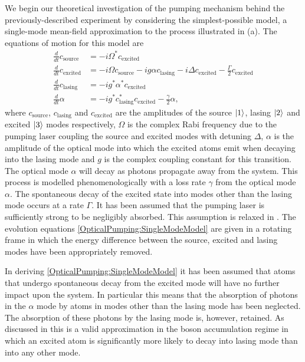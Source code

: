 We begin our theoretical investigation of the pumping mechanism behind the previously-described experiment by considering the simplest-possible model, a single-mode mean-field approximation to the process illustrated in (a).  The equations of motion for this model are
\begin{subequations}
    \label{OpticalPumping:SingleModeModel}
    \begin{align}
        \frac{d}{dt} c_\text{source} &= -i \Omega^* c_\text{excited} \\
        \frac{d }{dt}c_\text{excited} &= -i \Omega c_\text{source} -i g \alpha c_\text{lasing} - i \Delta c_\text{excited} - \frac{\Gamma}{2} c_\text{excited}\\
        \frac{d }{dt}c_\text{lasing} &= -i g^* \alpha^* c_\text{excited} \\
        \frac{d }{dt}\alpha &= -i g^* c_\text{lasing}^* c_\text{excited} - \frac{\gamma}{2} \alpha,
    \end{align} 
\end{subequations}
where $c_\text{source}$, $c_\text{lasing}$ and $c_\text{excited}$ are the amplitudes of the source ${\left|1\right>}$, lasing ${\left|2\right>}$ and excited ${\left|3\right>}$ modes respectively, $\Omega$ is the complex Rabi frequency due to the pumping laser coupling the source and excited modes with detuning $\Delta$, $\alpha$ is the amplitude of the optical mode into which the excited atoms emit when decaying into the lasing mode and $g$ is the complex coupling constant for this transition.  The optical mode $\alpha$ will decay as photons propagate away from the system.  This process is modelled phenomenologically with a loss rate $\gamma$ from the optical mode $\alpha$.  The spontaneous decay of the excited state into modes other than the lasing mode occurs at a rate $\Gamma$.  It has been assumed that the pumping laser is sufficiently strong to be negligibly absorbed.  This assumption is relaxed in .  The evolution equations \eqref{OpticalPumping:SingleModeModel} are given in a rotating frame in which the energy difference between the source, excited and lasing modes have been appropriately removed.

In deriving \eqref{OpticalPumping:SingleModeModel} it has been assumed that atoms that undergo spontaneous decay from the excited mode will have no further impact upon the system.  In particular this means that the absorption of photons in the $\alpha$ mode by atoms in modes other than the lasing mode has been neglected.  The absorption of these photons by the lasing mode is, however, retained.  As discussed in  this is a valid approximation in the boson accumulation regime in which an excited atom is significantly more likely to decay into lasing mode than into any other mode.

